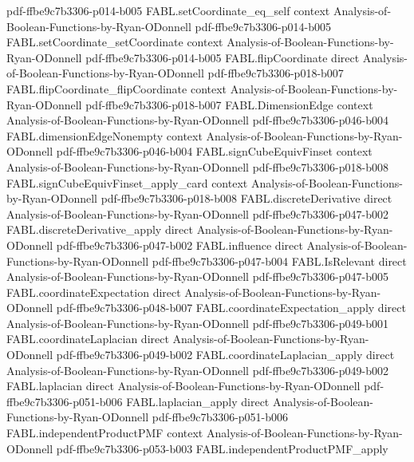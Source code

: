 \begin{theorem}
  {pdf-ffbe9c7b3306-p014-b005}
\proofstep
  {FABL.setCoordinate_eq_self}
  {context}
  {Analysis-of-Boolean-Functions-by-Ryan-ODonnell}
  {pdf-ffbe9c7b3306-p014-b005}
\proofstep
  {FABL.setCoordinate_setCoordinate}
  {context}
  {Analysis-of-Boolean-Functions-by-Ryan-ODonnell}
  {pdf-ffbe9c7b3306-p014-b005}
\proofstep
  {FABL.flipCoordinate}
  {direct}
  {Analysis-of-Boolean-Functions-by-Ryan-ODonnell}
  {pdf-ffbe9c7b3306-p018-b007}
\proofstep
  {FABL.flipCoordinate_flipCoordinate}
  {context}
  {Analysis-of-Boolean-Functions-by-Ryan-ODonnell}
  {pdf-ffbe9c7b3306-p018-b007}
\proofstep
  {FABL.DimensionEdge}
  {context}
  {Analysis-of-Boolean-Functions-by-Ryan-ODonnell}
  {pdf-ffbe9c7b3306-p046-b004}
\proofstep
  {FABL.dimensionEdgeNonempty}
  {context}
  {Analysis-of-Boolean-Functions-by-Ryan-ODonnell}
  {pdf-ffbe9c7b3306-p046-b004}
\proofstep
  {FABL.signCubeEquivFinset}
  {context}
  {Analysis-of-Boolean-Functions-by-Ryan-ODonnell}
  {pdf-ffbe9c7b3306-p018-b008}
\proofstep
  {FABL.signCubeEquivFinset_apply_card}
  {context}
  {Analysis-of-Boolean-Functions-by-Ryan-ODonnell}
  {pdf-ffbe9c7b3306-p018-b008}
\proofstep
  {FABL.discreteDerivative}
  {direct}
  {Analysis-of-Boolean-Functions-by-Ryan-ODonnell}
  {pdf-ffbe9c7b3306-p047-b002}
\proofstep
  {FABL.discreteDerivative_apply}
  {direct}
  {Analysis-of-Boolean-Functions-by-Ryan-ODonnell}
  {pdf-ffbe9c7b3306-p047-b002}
\proofstep
  {FABL.influence}
  {direct}
  {Analysis-of-Boolean-Functions-by-Ryan-ODonnell}
  {pdf-ffbe9c7b3306-p047-b004}
\proofstep
  {FABL.IsRelevant}
  {direct}
  {Analysis-of-Boolean-Functions-by-Ryan-ODonnell}
  {pdf-ffbe9c7b3306-p047-b005}
\proofstep
  {FABL.coordinateExpectation}
  {direct}
  {Analysis-of-Boolean-Functions-by-Ryan-ODonnell}
  {pdf-ffbe9c7b3306-p048-b007}
\proofstep
  {FABL.coordinateExpectation_apply}
  {direct}
  {Analysis-of-Boolean-Functions-by-Ryan-ODonnell}
  {pdf-ffbe9c7b3306-p049-b001}
\proofstep
  {FABL.coordinateLaplacian}
  {direct}
  {Analysis-of-Boolean-Functions-by-Ryan-ODonnell}
  {pdf-ffbe9c7b3306-p049-b002}
\proofstep
  {FABL.coordinateLaplacian_apply}
  {direct}
  {Analysis-of-Boolean-Functions-by-Ryan-ODonnell}
  {pdf-ffbe9c7b3306-p049-b002}
\proofstep
  {FABL.laplacian}
  {direct}
  {Analysis-of-Boolean-Functions-by-Ryan-ODonnell}
  {pdf-ffbe9c7b3306-p051-b006}
\proofstep
  {FABL.laplacian_apply}
  {direct}
  {Analysis-of-Boolean-Functions-by-Ryan-ODonnell}
  {pdf-ffbe9c7b3306-p051-b006}
\proofstep
  {FABL.independentProductPMF}
  {context}
  {Analysis-of-Boolean-Functions-by-Ryan-ODonnell}
  {pdf-ffbe9c7b3306-p053-b003}
\proofstep
  {FABL.independentProductPMF_apply}

\end{theorem}
